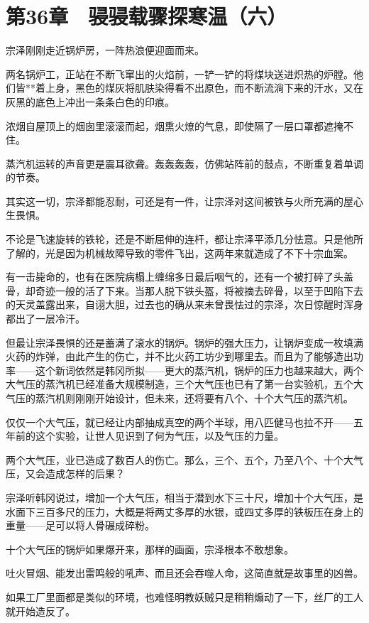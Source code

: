 \section{第36章　骎骎载骤探寒温（六）}

宗泽刚刚走近锅炉房，一阵热浪便迎面而来。

两名锅炉工，正站在不断飞窜出的火焰前，一铲一铲的将煤块送进炽热的炉膛。他们皆**着上身，黑色的煤灰将肌肤染得看不出原色，而不断流淌下来的汗水，又在灰黑的底色上冲出一条条白色的印痕。

浓烟自屋顶上的烟囱里滚滚而起，烟熏火燎的气息，即使隔了一层口罩都遮掩不住。

蒸汽机运转的声音更是震耳欲聋。轰轰轰轰，仿佛站阵前的鼓点，不断重复着单调的节奏。

其实这一切，宗泽都能忍耐，可还是有一件，让宗泽对这间被铁与火所充满的屋心生畏惧。

不论是飞速旋转的铁轮，还是不断屈伸的连杆，都让宗泽平添几分怯意。只是他所了解的，光是因为机械故障导致的零件飞出，这两年来就造成了不下十宗血案。

有一击毙命的，也有在医院病榻上缠绵多日最后咽气的，还有一个被打碎了头盖骨，却奇迹一般的活了下来。当那人脱下铁头盔，将被摘去碎骨，以至于凹陷下去的天灵盖露出来，自诩大胆，过去也的确从来未曾畏怯过的宗泽，次日惊醒时浑身都出了一层冷汗。

但最让宗泽畏惧的还是蓄满了滚水的锅炉。锅炉的强大压力，让锅炉变成一枚填满火药的炸弹，由此产生的伤亡，并不比火药工坊少到哪里去。而且为了能够造出功率——这个新词依然是韩冈所拟——更大的蒸汽机，锅炉的压力也越来越大，两个大气压的蒸汽机已经准备大规模制造，三个大气压也已有了第一台实验机，五个大气压的蒸汽机则刚刚开始设计，但未来，还将要有八个、十个大气压的蒸汽机。

仅仅一个大气压，就已经让内部抽成真空的两个半球，用八匹健马也拉不开——五年前的这个实验，让世人见识到了何为气压，以及气压的力量。

两个大气压，业已造成了数百人的伤亡。那么，三个、五个，乃至八个、十个大气压，又会造成怎样的后果？

宗泽听韩冈说过，增加一个大气压，相当于潜到水下三十尺，增加十个大气压，是水面下三百多尺的压力，大概是将两丈多厚的水银，或四丈多厚的铁板压在身上的重量——足可以将人骨碾成碎粉。

十个大气压的锅炉如果爆开来，那样的画面，宗泽根本不敢想象。

吐火冒烟、能发出雷鸣般的吼声、而且还会吞噬人命，这简直就是故事里的凶兽。

如果工厂里面都是类似的环境，也难怪明教妖贼只是稍稍煽动了一下，丝厂的工人就开始造反了。

